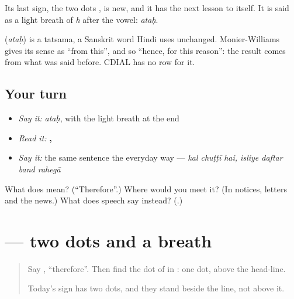 Its last sign, the two dots \textbf{}, is new, and it has the next lesson to itself. It is said as a light breath of \emph{h} after the vowel: \emph{ataḥ}.

\begin{cousinweb}
\textbf{} (\emph{ataḥ}) is a tatsama, a Sanskrit word Hindi uses unchanged. Monier-Williams gives its sense as \textquotedblleft{}from this\textquotedblright{}, and so \textquotedblleft{}hence, for this reason\textquotedblright{}: the result comes from what was said before. CDIAL has no row for it.
\end{cousinweb}

\subsection*{Your turn}
\begin{itemize}
\raggedright
  \item \emph{Say it:} \emph{ataḥ}, with the light breath at the end
  \item \emph{Read it:} \textbf{  ,    }
  \item \emph{Say it:} the same sentence the everyday way — \emph{kal chuṭṭī hai, isliye daftar band rahegā}
\end{itemize}

\begin{tcolorbox}[breakable,colback=teal!4,colframe=teal!35!black,title={Before you move on}]
What does \textbf{} mean? (\textquotedblleft{}Therefore\textquotedblright{}.) Where would you meet it? (In notices, letters and the news.) What does speech say instead? (\textbf{}.)
\end{tcolorbox}
\section[\texorpdfstring{\hi{ः} (ḥ)}{ः (ḥ)}]{ — two dots and a breath}

\label{lesson:HI-W281-sign-visarga}



\begin{quote}
Say \textbf{}, \textquotedblleft{}therefore\textquotedblright{}. Then find the dot of \textbf{} in \textbf{}: one dot, above the head-line.

Today's sign has two dots, and they stand beside the line, not above it.
\end{quote}

